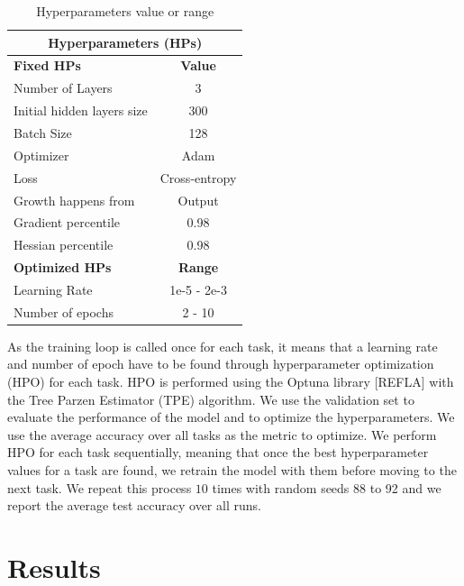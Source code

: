 \documentclass[11pt]{article}
\begin{document}
\begin{table}[h!]
    \centering
    \begin{tabular}{|l|c|}
    \hline
    \multicolumn{2}{|c|}{\textbf{Hyperparameters (HPs)}} \\
    \hline
    \textbf{Fixed HPs} & \textbf{Value}\\
    \hline
    Number of Layers & 3 \\
    Initial hidden layers size & 300 \\
    Batch Size & 128 \\
    Optimizer & Adam \\
    Loss & Cross-entropy \\
    Growth happens from & Output \\
    Gradient percentile & 0.98 \\
    Hessian percentile & 0.98 \\
    \hline
    \hline
    \textbf{Optimized HPs} & \textbf{Range}\\
    \hline
    Learning Rate & 1e-5 - 2e-3 \\
    Number of epochs & 2 - 10 \\
    \hline
    \end{tabular}
    \caption{Hyperparameters value or range}
    \label{table:HPs}
\end{table}


As the training loop is called once for each task, it means that a learning rate and number of epoch have to be found through hyperparameter optimization (HPO) for each task. HPO is performed using the Optuna library [REFLA] with the Tree Parzen Estimator (TPE) algorithm. We use the validation set to evaluate the performance of the model and to optimize the hyperparameters. We use the average accuracy over all tasks as the metric to optimize. We perform HPO for each task sequentially, meaning that once the best hyperparameter values for a task are found, we retrain the model with them before moving to the next task. We repeat this process $10$ times with random seeds 88 to 92 and we report the average test accuracy over all runs.



\section{Results}
\end{document}
